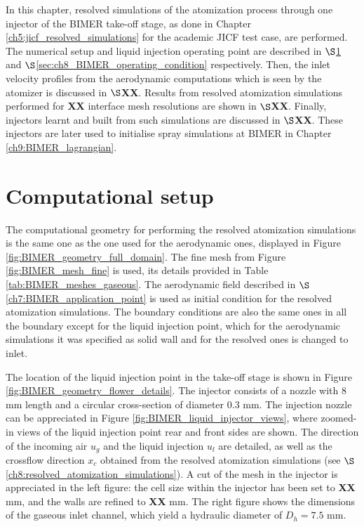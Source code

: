 In this chapter, resolved simulations of the atomization process through one injector of the BIMER take-off stage, as done in Chapter \ref{ch5:jicf_resolved_simulations} for the academic JICF test case, are performed. The numerical setup and liquid injection operating point are described in $\S$\ref{sec:ch8_BIMER_computational_setup} and $\S$\ref{sec:ch8_BIMER_operating_condition} respectively. Then, the inlet velocity profiles from the aerodynamic computations which is seen by the atomizer is discussed in $\S$\textbf{XX}. Results from resolved atomization simulations performed for \textbf{XX} interface mesh resolutions are shown in $\S$\textbf{XX}. Finally, injectors learnt and built from such simulations are discussed in $\S$\textbf{XX}. These injectors are later used to initialise spray simulations at BIMER in Chapter \ref{ch9:BIMER_lagrangian}.



\section{Computational setup}
\label{sec:ch8_BIMER_computational_setup}

The computational geometry for performing the resolved atomization simulations is the same one as the one used for the aerodynamic ones, displayed in Figure \ref{fig:BIMER_geometry_full_domain}. The fine mesh from Figure \ref{fig:BIMER_mesh_fine} is used, its details provided in Table \ref{tab:BIMER_meshes_gaseous}. The aerodynamic field described in $\S$\ref{ch7:BIMER_application_point} is used as initial condition for the resolved atomization simulations. The boundary conditions are also the same ones in all the boundary except for the liquid injection point, which for the aerodynamic simulations it was specified as solid wall and for the resolved ones is changed to inlet. 

The location of the liquid injection point in the take-off stage is shown in Figure \ref{fig:BIMER_geometry_flower_details}. The injector consists of a nozzle with 8 mm length and a circular cross-section of diameter 0.3 mm. The injection nozzle can be appreciated in Figure \ref{fig:BIMER_liquid_injector_views}, where zoomed-in views of the liquid injection point rear and front sides are shown. The direction of the incoming air $u_g$ and the liquid injection $u_l$ are detailed, as well as the crossflow direction $x_c$ obtained from the resolved atomization simulations (see $\S$\ref{ch8:resolved_atomization_simulations}). A cut of the mesh in the injector is appreciated in the left figure: the cell size within the injector has been set to \textbf{XX} mm, and the walls are refined to \textbf{XX} mm. The right figure shows the dimensions of the gaseous inlet channel, which yield a hydraulic diameter of $D_h = 7.5$ mm. 


